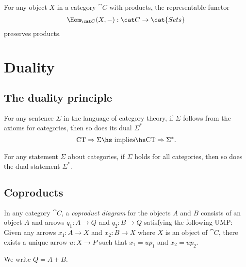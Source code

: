 \documentclass{article}
\begin{document}
\begin{corollary}[Awodey 2.22]
	For any object $X$ in a category $\cat C$ with products, the representable
	functor
	\begin{align*}
		\Hom_{\cat C}(X, -) : \cat C \to \cat{Sets}
	\end{align*}
	preserves products.
\end{corollary}

\section{Duality}

\subsection{The duality principle}

\begin{proposition}
	For any sentence $\Sigma$ in the language of category theory,
	if $\Sigma$ follows from the axioms for categories, then so does
	its dual $\Sigma^*$
	\begin{align*}
		\text{CT}\Rightarrow \Sigma \text{\hs implies\hs} \text{CT}\Rightarrow \Sigma^*.
	\end{align*}
\end{proposition}

\begin{proposition}
	For any statement $\Sigma$ about categories, if $\Sigma$ holds for all categories,
	then so does the dual statement $\Sigma^*$.
\end{proposition}

\subsection{Coproducts}

\begin{definition}
	In any category $\cat C$, a \emph{coproduct diagram} for the objects $A$ and $B$
	consists of an object $A$ and arrows $q_1:A\to Q$ and $q_2:B\to Q$ satisfying
	the following UMP: Given any arrows $x_1:A\to X$ and $x_2:B\to X$ where $X$ is an
	object of $\cat C$, there exists a unique arrow $u:X\to P$ such that $x_1=up_1$
	and $x_2=up_2$.
	\begin{center}
	\end{center}
	We write $Q=A+B$.
\end{definition}
\end{document}
